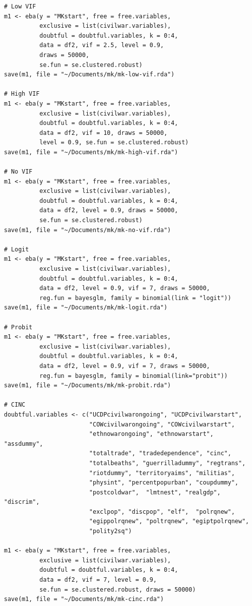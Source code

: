 \begin{verbatim}
# Low VIF
m1 <- eba(y = "MKstart", free = free.variables,
          exclusive = list(civilwar.variables),
          doubtful = doubtful.variables, k = 0:4,
          data = df2, vif = 2.5, level = 0.9,
          draws = 50000,
          se.fun = se.clustered.robust)
save(m1, file = "~/Documents/mk/mk-low-vif.rda")

# High VIF
m1 <- eba(y = "MKstart", free = free.variables,
          exclusive = list(civilwar.variables),
          doubtful = doubtful.variables, k = 0:4,
          data = df2, vif = 10, draws = 50000,
          level = 0.9, se.fun = se.clustered.robust)
save(m1, file = "~/Documents/mk/mk-high-vif.rda")

# No VIF
m1 <- eba(y = "MKstart", free = free.variables,
          exclusive = list(civilwar.variables),
          doubtful = doubtful.variables, k = 0:4,
          data = df2, level = 0.9, draws = 50000,
          se.fun = se.clustered.robust)
save(m1, file = "~/Documents/mk/mk-no-vif.rda")

# Logit
m1 <- eba(y = "MKstart", free = free.variables,
          exclusive = list(civilwar.variables),
          doubtful = doubtful.variables, k = 0:4,
          data = df2, level = 0.9, vif = 7, draws = 50000,
          reg.fun = bayesglm, family = binomial(link = "logit"))
save(m1, file = "~/Documents/mk/mk-logit.rda")

# Probit
m1 <- eba(y = "MKstart", free = free.variables,
          exclusive = list(civilwar.variables),
          doubtful = doubtful.variables, k = 0:4,
          data = df2, level = 0.9, vif = 7, draws = 50000,
          reg.fun = bayesglm, family = binomial(link="probit"))
save(m1, file = "~/Documents/mk/mk-probit.rda")

# CINC
doubtful.variables <- c("UCDPcivilwarongoing", "UCDPcivilwarstart",
                        "COWcivilwarongoing", "COWcivilwarstart",
                        "ethnowarongoing", "ethnowarstart", "assdummy",
                        "totaltrade", "tradedependence", "cinc",
                        "totalbeaths", "guerrilladummy", "regtrans",
                        "riotdummy", "territoryaims", "militias",
                        "physint", "percentpopurban", "coupdummy",
                        "postcoldwar",  "lmtnest", "realgdp", "discrim",
                        "exclpop", "discpop", "elf",  "polrqnew",
                        "egippolrqnew", "poltrqnew", "egiptpolrqnew",
                        "polity2sq")

m1 <- eba(y = "MKstart", free = free.variables,
          exclusive = list(civilwar.variables),
          doubtful = doubtful.variables, k = 0:4,
          data = df2, vif = 7, level = 0.9, 
          se.fun = se.clustered.robust, draws = 50000)
save(m1, file = "~/Documents/mk/mk-cinc.rda")


\end{verbatim}
